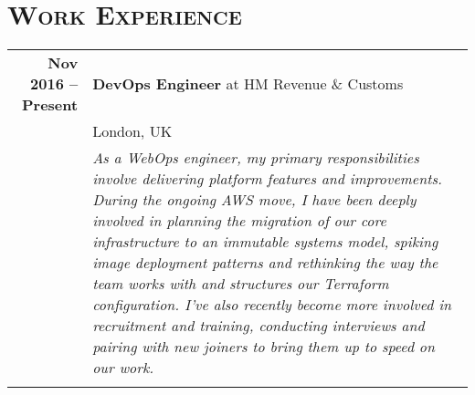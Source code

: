 \documentclass[a4paper,10pt]{article} %
\begin{document}
\section{\textsc{Work Experience}}
\centering
\begin{tabularx}{\textwidth}{r|X}
\textbf{Nov 2016 -- Present}       & \textbf{DevOps Engineer} at HM Revenue \& Customs \\
                                   & London, UK \\
                                   & \footnotesize\emph{As a WebOps engineer,
                                   my primary responsibilities involve
                                   delivering platform features and
                                   improvements. During the ongoing AWS move, I
                                   have been deeply involved in planning the
                                   migration of our core infrastructure to an
                                   immutable systems model, spiking image
                                   deployment patterns and rethinking the way
                                   the team works with and structures our
                                   Terraform configuration. I've also recently
                                   become more involved in recruitment and
                                   training, conducting interviews and pairing
                                   with new joiners to bring them up to speed
                                   on our work.} \\

\multicolumn{2}{r}{} \\ %


\end{tabularx}
\end{document}
